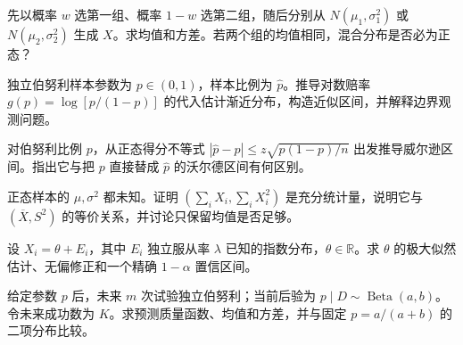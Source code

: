 \begin{exercise}[混合正态的方差分解]\label{q:B17.9}
先以概率 $w$ 选第一组、概率 $1-w$ 选第二组，随后分别从 $N(\mu_1,\sigma_1^2)$ 或 $N(\mu_2,\sigma_2^2)$ 生成 $X$。求均值和方差。若两个组的均值相同，混合分布是否必为正态？\par{}\end{exercise}

\begin{exercise}[德尔塔方法估计风险函数]\label{q:B17.10}
独立伯努利样本参数为 $p\in(0,1)$，样本比例为 $\widehat p$。推导对数赔率 $g(p)=\log[p/(1-p)]$ 的代入估计渐近分布，构造近似区间，并解释边界观测问题。\par{}\end{exercise}

\begin{exercise}[威尔逊比例区间的反演]\label{q:B17.11}
对伯努利比例 $p$，从正态得分不等式 $|\widehat p-p|\le z\sqrt{p(1-p)/n}$ 出发推导威尔逊区间。指出它与把 $p$ 直接替成 $\widehat p$ 的沃尔德区间有何区别。\par{}\end{exercise}

\begin{exercise}[正态模型的充分统计量]\label{q:B17.12}
正态样本的 $\mu,\sigma^2$ 都未知。证明 $(\sum_iX_i,\sum_iX_i^2)$ 是充分统计量，说明它与 $(\overline X,S^2)$ 的等价关系，并讨论只保留均值是否足够。\par{}\end{exercise}

\begin{exercise}[最小值模型的非对称估计]\label{q:B17.13}
设 $X_i=\theta+E_i$，其中 $E_i$ 独立服从率 $\lambda$ 已知的指数分布，$\theta\in\mathbb R$。求 $\theta$ 的极大似然估计、无偏修正和一个精确 $1-\alpha$ 置信区间。\par{}\end{exercise}

\begin{exercise}[贝塔—二项预测的额外变异]\label{q:B17.14}
给定参数 $p$ 后，未来 $m$ 次试验独立伯努利；当前后验为 $p\mid D\sim\operatorname{Beta}(a,b)$。令未来成功数为 $K$。求预测质量函数、均值和方差，并与固定 $p=a/(a+b)$ 的二项分布比较。\par{}\end{exercise}

